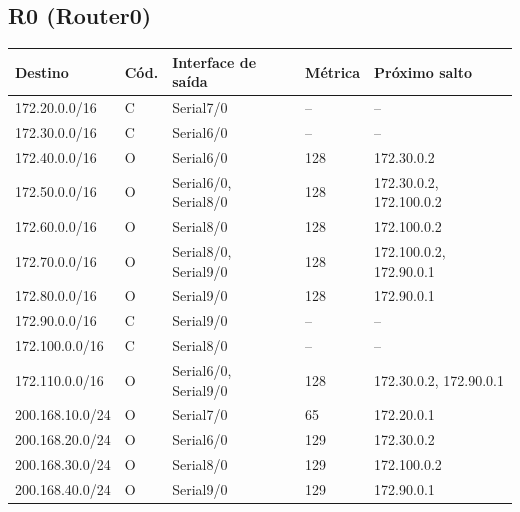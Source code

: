 \subsection*{R0 (Router0)}
\begin{tabular}{@{}llllp{3.6cm}@{}}\toprule Destino & Cód. & Interface de saída & Métrica & Próximo salto\\\midrule
172.20.0.0/16 & C & Serial7/0 & -- & --\\
172.30.0.0/16 & C & Serial6/0 & -- & --\\
172.40.0.0/16 & O & Serial6/0 & 128 & 172.30.0.2\\
172.50.0.0/16 & O & Serial6/0, Serial8/0 & 128 & 172.30.0.2, 172.100.0.2\\
172.60.0.0/16 & O & Serial8/0 & 128 & 172.100.0.2\\
172.70.0.0/16 & O & Serial8/0, Serial9/0 & 128 & 172.100.0.2, 172.90.0.1\\
172.80.0.0/16 & O & Serial9/0 & 128 & 172.90.0.1\\
172.90.0.0/16 & C & Serial9/0 & -- & --\\
172.100.0.0/16 & C & Serial8/0 & -- & --\\
172.110.0.0/16 & O & Serial6/0, Serial9/0 & 128 & 172.30.0.2, 172.90.0.1\\
200.168.10.0/24 & O & Serial7/0 & 65 & 172.20.0.1\\
200.168.20.0/24 & O & Serial6/0 & 129 & 172.30.0.2\\
200.168.30.0/24 & O & Serial8/0 & 129 & 172.100.0.2\\
200.168.40.0/24 & O & Serial9/0 & 129 & 172.90.0.1\\
\bottomrule\end{tabular}

